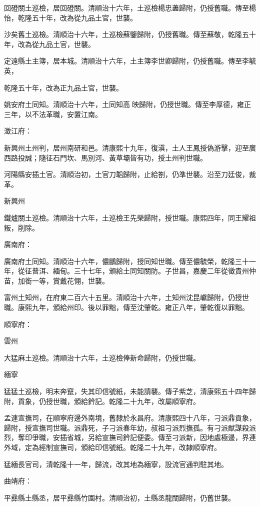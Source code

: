 \begin{pinyinscope}
回磴關土巡檢，居回磴關。清順治十六年，土巡檢楊忠藎歸附，仍授舊職。傳至楊怡，乾隆五十年，改為從九品土官，世襲。

沙矣舊土巡檢。清順治十六年，土巡檢蘇鑒歸附，仍授舊職。傳至蘇敬，乾隆五十年，改為從九品土官，世襲。

定遠縣土主簿，居本城。清順治十六年，土主簿李世卿歸附，仍授舊職。傳至李毓英，

乾隆五十年，改為正九品土官，世襲。

姚安府土同知。清順治十六年，土同知高映歸附，仍授世職。傳至李厚德，雍正三年，以不法革職，安置江南。

澂江府：

新興州土州判，居州南研和邑。清康熙十九年，復滇，土人王鳳授偽游擊，迎至廣西路投誠；隨征石門坎、馬別河、黃草壩皆有功，授土州判世職。

河陽縣安插土官。清順治初，土官刀韜歸附，止給劄，仍準世襲。沿至刀廷俊，裁革。

新興州

鐵爐關土巡檢。清順治十六年，土巡檢王先榮歸附，授世職。康熙四年，同王耀祖叛，削除。

廣南府：

廣南府土同知。清順治十六年，儂鵬歸附，授同知世職。傳至儂毓榮，乾隆三十一年，從征普洱、緬甸。三十七年，頒給土同知關防。子世昌，嘉慶二年從徵貴州仲苗，加銜一等，賞戴花翎，世襲。

富州土知州，在府東二百六十五里。清順治十六年，土知州沈昆巘歸附，仍授世職。康熙九年，頒給州印。後以罪黜，傳至沈肇乾。雍正八年，肇乾復以罪黜。

順寧府：

雲州

大猛麻土巡檢。清順治十六年，土巡檢俸新命歸附，仍授世職。

緬寧

猛猛土巡檢，明末奔竄，失其印信號紙，未能請襲。傳子紫芝，清康熙五十四年歸附，貢象，仍授世職，頒給鈐記。乾隆二十九年，改屬順寧府。

孟連宣撫司，在順寧府邊外南境，舊隸於永昌府。清康熙四十八年，刁派鼎貢象，歸附，授宣撫司世職。派鼎死，子刁派春年幼，叔祖刁派烈撫孤。有刁派猷謀殺派烈，奪印爭職，安插省城，另給宣撫司鈐記便委。傳至刁派新，因地處極邊，界連外域，定為經制宣撫司，頒給印信號紙。乾隆二十九年，改隸順寧府。

猛緬長官司，清乾隆十一年，歸流，改其地為緬寧，設流官通判駐其地。

曲靖府：

平彞縣土縣丞，居平彞縣竹園村。清順治初，土縣丞龍闊歸附，仍舊世襲。


\end{pinyinscope}